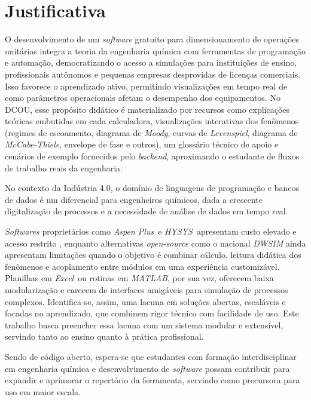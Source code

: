 \chapter{Justificativa}

O desenvolvimento de um \textit{software} gratuito para dimensionamento de operações unitárias integra a teoria da engenharia química com ferramentas de programação e automação, democratizando o acesso a simulações para instituições de ensino, profissionais autônomos e pequenas empresas desprovidas de licenças comerciais. Isso favorece o aprendizado ativo, permitindo visualizações em tempo real de como parâmetros operacionais afetam o desempenho dos equipamentos. No DCOU, esse propósito didático é materializado por recursos como explicações teóricas embutidas em cada calculadora, visualizações interativas dos fenômenos (regimes de escoamento, diagrama de \textit{Moody}, curvas de \textit{Levenspiel}, diagrama de \textit{McCabe-Thiele}, envelope de fase e outros), um glossário técnico de apoio e cenários de exemplo fornecidos pelo \textit{backend}, aproximando o estudante de fluxos de trabalho reais da engenharia.

No contexto da Indústria 4.0, o domínio de linguagens de programação e bancos de dados é um diferencial para engenheiros químicos, dada a crescente digitalização de processos e a necessidade de análise de dados em tempo real.

\textit{Softwares} proprietários como \textit{Aspen Plus}\textregistered\ e \textit{HYSYS}\textregistered\ apresentam custo elevado e acesso restrito \cite{aspen2025,aspenhysys2026,alves2022}, enquanto alternativas \textit{open-source} como o nacional \textit{DWSIM} \cite{dwsim2025} ainda apresentam limitações quando o objetivo é combinar cálculo, leitura didática dos fenômenos e acoplamento entre módulos em uma experiência customizável. Planilhas em \textit{Excel}\textregistered\ ou rotinas em \textit{MATLAB}\textregistered, por sua vez, oferecem baixa modularização e carecem de interfaces amigáveis para simulação de processos complexos. Identifica-se, assim, uma lacuna em soluções abertas, escaláveis e focadas no aprendizado, que combinem rigor técnico com facilidade de uso. Este trabalho busca preencher essa lacuna com um sistema modular e extensível, servindo tanto ao ensino quanto à prática profissional.

Sendo de código aberto, espera-se que estudantes com formação interdisciplinar em engenharia química e desenvolvimento de \textit{software} possam contribuir para expandir e aprimorar o repertório da ferramenta, servindo como precursora para uso em maior escala.
